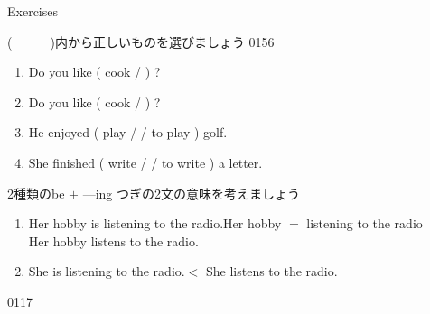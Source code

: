 \documentclass[aspectratio=169,xcolor={dvipsnames,table}]{beamer}
\begin{document}
\begin{frame}[plain]{Exercises}

{\small (~~~~~~)内から正しいものを選びましょう}%
\hfill{\tiny 0156}\,{\scriptsize {}}
 \begin{enumerate}
  \item Do you like ( cook /  ) ?
  \item Do you like ( cook /  ) ?
  \item He enjoyed ( play /  / to play ) golf.
  \item She finished ( write /  / to write ) a letter.
 \end{enumerate}
\end{frame}
\begin{frame}[plain]{2種類のbe $+$ ---ing}
つぎの2文の意味を考えましょう\,\,\textdbend\textdbend

 \begin{enumerate}
  \item Her hobby is listening to the radio.\hfill{\scriptsize Her hobby $=$ listening to the radio}\\
\hfill{\scriptsize *Her hobby listens to the radio.}
  \item She is listening to the radio.\hfill{\scriptsize $<$ She listens to the radio.}
 \end{enumerate}
%
\hfill{\tiny 0117}\,{\scriptsize {}}
\end{frame}
\end{document}
